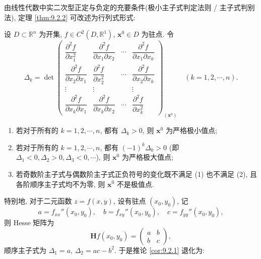由线性代数中实二次型正定与负定的充要条件(极小主子式判定法则 / 主子式判别法), 定理 \ref{thm:9.2.2} 可改述为行列式形式:

\begin{corollary}\label{cor:9.2.1}
设 $D \subset \mathbb{R}^{n}$ 为开集, $f \in C^{2}(D, \mathbb{R}^{1})$, $\boldsymbol{x}^{0} \in D$ 为驻点. 令
\[
  \Delta_{k} = \det\begin{pmatrix}
    \dfrac{\partial^{2}f}{\partial x_{1}^{2}} & \dfrac{\partial^{2}f}{\partial x_{1}\partial x_{2}} & \cdots & \dfrac{\partial^{2}f}{\partial x_{1}\partial x_{k}} \\
    \dfrac{\partial^{2}f}{\partial x_{2}\partial x_{1}} & \dfrac{\partial^{2}f}{\partial x_{2}^{2}} & \cdots & \dfrac{\partial^{2}f}{\partial x_{2}\partial x_{k}} \\
    \vdots & \vdots & & \vdots \\
    \dfrac{\partial^{2}f}{\partial x_{k}\partial x_{1}} & \dfrac{\partial^{2}f}{\partial x_{k}\partial x_{2}} & \cdots & \dfrac{\partial^{2}f}{\partial x_{k}^{2}}
  \end{pmatrix}_{(\boldsymbol{x}^{0})} \quad (k = 1, 2, \cdots, n).
\]
\begin{enumerate}
  \item 若对于所有的 $k = 1, 2, \cdots, n$, 都有 $\Delta_{k} > 0$, 则 $\boldsymbol{x}^{0}$ 为严格极小值点;
  \item 若对于所有的 $k = 1, 2, \cdots, n$, 都有 $(-1)^{k} \Delta_{k} > 0$ (即 $\Delta_{1} < 0, \Delta_{2} > 0, \Delta_{3} < 0, \cdots$), 则 $\boldsymbol{x}^{0}$ 为严格极大值点;
  \item 若奇数阶主子式与偶数阶主子式正负符号的变化既不满足 (1) 也不满足 (2), 且各阶顺序主子式均不为零, 则 $\boldsymbol{x}^{0}$ 不是极值点.
\end{enumerate}
\end{corollary}

特别地, 对于二元函数 $z = f(x, y)$, 设有驻点 $(x_{0}, y_{0})$, 记
\[
  a = f_{xx}''(x_{0}, y_{0}), \quad b = f_{xy}''(x_{0}, y_{0}), \quad c = f_{yy}''(x_{0}, y_{0}),
\]
则 Hesse 矩阵为
\[
  \boldsymbol{H}f(x_{0}, y_{0}) = \begin{pmatrix} a & b \\ b & c \end{pmatrix},
\]
顺序主子式为 $\Delta_{1} = a$, $\Delta_{2} = ac - b^{2}$. 于是推论 \ref{cor:9.2.1} 退化为:

